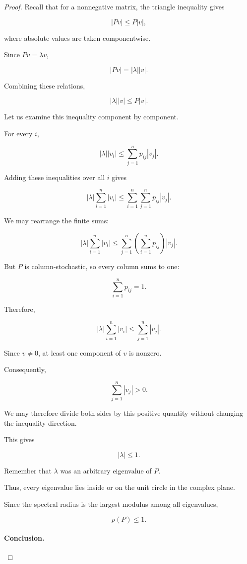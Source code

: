 \documentclass[11pt,a4paper]{article}
\theoremstyle{definition}
\theoremstyle{remark}
\begin{document}
\begin{proof}
Recall that for a nonnegative matrix,
the triangle inequality gives

\[
|Pv|\leq P|v|,
\]

where absolute values are
taken componentwise.

Since $Pv=\lambda v$,

\[
|Pv|=|\lambda||v|.
\]

Combining these relations,

\begin{equation}
|\lambda||v|\leq P|v|.
\label{eq:stochastic_eigenvalue_bound}
\end{equation}

Let us examine this inequality
component by component.

For every $i$,

\[
|\lambda||v_i|
\leq
\sum_{j=1}^{n}p_{ij}|v_j|.
\]

Adding these inequalities
over all $i$ gives

\[
|\lambda|
\sum_{i=1}^{n}|v_i|
\leq
\sum_{i=1}^{n}
\sum_{j=1}^{n}p_{ij}|v_j|.
\]

We may rearrange the finite sums:

\[
|\lambda|
\sum_{i=1}^{n}|v_i|
\leq
\sum_{j=1}^{n}
\left(
\sum_{i=1}^{n}p_{ij}
\right)|v_j|.
\]

But $P$ is column-stochastic,
so every column sums to one:

\[
\sum_{i=1}^{n}p_{ij}=1.
\]

Therefore,

\[
|\lambda|
\sum_{i=1}^{n}|v_i|
\leq
\sum_{j=1}^{n}|v_j|.
\]

Since $v\neq0$, at least one
component of $v$ is nonzero.

Consequently,

\[
\sum_{j=1}^{n}|v_j|>0.
\]

We may therefore divide
both sides by this positive
quantity without changing
the inequality direction.

This gives

\[
\boxed{|\lambda|\leq1.}
\]

Remember that $\lambda$
was an arbitrary eigenvalue
of $P$.

Thus, every eigenvalue
lies inside or on the
unit circle in the
complex plane.

Since the spectral radius
is the largest modulus
among all eigenvalues,

\[
\boxed{\rho(P)\leq1.}
\]


\paragraph{Conclusion.}


\end{proof}
\end{document}
